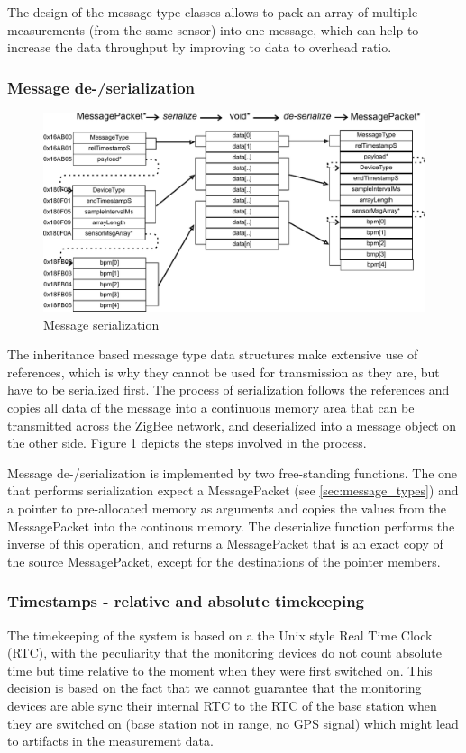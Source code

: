The design of the message type classes allows to pack an array of multiple measurements (from the same sensor) into one message, which can help to increase the data throughput by improving to data to overhead ratio.

\subsubsection{Message de-/serialization}
\label{sec:message_serialization}
\begin{figure}
\includegraphics[width=\textwidth]{Images/msg_serialization}
\caption{Message serialization}
\label{fig:msg_serialization}
\end{figure}

The inheritance based message type data structures make extensive use of references, which is why they cannot be used for transmission as they are, but have to be serialized first. The process of serialization follows the references and copies all data of the message into a continuous memory area that can be transmitted across the ZigBee network, and deserialized into a message object on the other side. Figure \ref{fig:msg_serialization} depicts the steps involved in the process.

Message de-/serialization is implemented by two free-standing functions. The one that performs serialization expect a MessagePacket (see \ref{sec:message_types}) and a pointer to pre-allocated memory as arguments and copies the values from the MessagePacket into the continous memory. The deserialize function performs the inverse of this operation, and returns a MessagePacket that is an exact copy of the source MessagePacket, except for the destinations of the pointer members.

\subsubsection{Timestamps - relative and absolute timekeeping}
The timekeeping of the system is based on a the Unix style Real Time Clock (RTC), with the peculiarity that the monitoring devices do not count absolute time but time relative to the moment when they were first switched on. This decision is based on the fact that we cannot guarantee that the monitoring devices are able sync their internal RTC to the RTC of the base station when they are switched on (base station not in range, no GPS signal) which might lead to artifacts in the measurement data.

